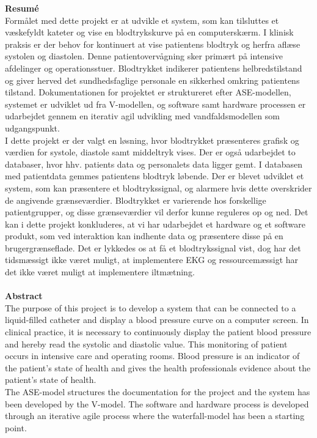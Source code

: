 \textbf{Resumé}\\
Formålet med dette projekt er at udvikle et system, som kan tilsluttes et væskefyldt kateter og vise en blodtrykskurve på en computerskærm. I klinisk praksis er der behov for kontinuert at vise patientens blodtryk og herfra aflæse systolen og diastolen. Denne patientovervågning sker primært på intensive afdelinger og operationsstuer. Blodtrykket indikerer patientens helbredstilstand og giver herved det sundhedsfaglige personale en sikkerhed omkring patientens tilstand. Dokumentationen for projektet er struktureret efter ASE-modellen, systemet er udviklet ud fra V-modellen, og software samt hardware processen er udarbejdet gennem en iterativ agil udvikling med vandfaldsmodellen som udgangspunkt. \\
I dette projekt er der valgt en løsning, hvor blodtrykket præsenteres grafisk og værdien for systole, diastole samt middeltryk vises. Der er også udarbejdet to databaser, hvor hhv. patients data og personalets data ligger gemt. I databasen med patientdata gemmes patientens blodtryk løbende. Der er blevet udviklet et system, som kan præsentere et blodtrykssignal, og alarmere hvis dette overskrider de angivende grænseværdier. Blodtrykket er varierende hos forskellige patientgrupper, og disse grænseværdier vil derfor kunne reguleres op og ned. Det kan i dette projekt konkluderes, at vi har udarbejdet et hardware og et software produkt, som ved interaktion kan indhente data og præsentere disse på en brugergrænseflade. Det er lykkedes os at få et blodtrykssignal vist, dog har det tidsmæssigt ikke været muligt, at implementere EKG og ressourcemæssigt har det ikke været muligt at implementere iltmætning. \\\\
\textbf{Abstract}\\
The purpose of this project is to develop a system that can be connected to a liquid-filled catheter and display a blood pressure curve on a computer screen. In clinical practice, it is necessary to continuously display the patient blood pressure and hereby read the systolic and diastolic value. This monitoring of patient occurs in intensive care and operating rooms. Blood pressure is an indicator of the patient’s state of health and gives the health professionals evidence about the patient’s state of health. \\
The ASE-model structures the documentation for the project and the system has been developed by the V-model. The software and hardware process is developed through an iterative agile process where the waterfall-model has been a starting point.\\
